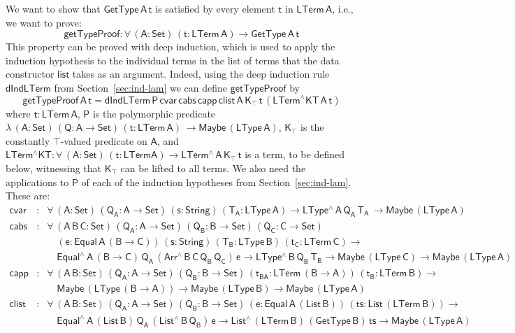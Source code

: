 \documentclass[9pt]{entcs}
\begin{document}
\noindent
We want to show that $\mathsf{GetType\,A\,t}$ is satisfied by every
element $\mathsf{t}$ in $\mathsf{LTerm\,A}$, i.e., we want to prove:
\[ \mathsf{getTypeProof : \forall \, (A : Set)\, (t : LTerm\,A) \to
   GetType \,A \,t}\] This property can be proved with deep
induction, which is used to apply the induction hypothesis to the
individual terms in the list of terms that the data constructor
$\mathsf{list}$ takes as an argument. Indeed, using the deep induction
rule $\mathsf{dIndLTerm}$ from Section~\ref{sec:ind-lam} we can define
$\mathsf{getTypeProof}$ by
\[ \mathsf{getTypeProof \,A \,t = 
    dIndLTerm\, P \, cvar\, cabs\, capp\, clist\, A\, K_\top\, t\,
    (LTerm^\wedge KT\, A\, t) }\] where $\mathsf{t : LTerm\,A}$,
$\mathsf{P}$ is the polymorphic predicate $\mathsf{ \lambda \, (A:
  Set)\, (Q : A \to Set)\, (t : LTerm\,A)\, \to Maybe \, (LType \,
  A)}$, $\mathsf{K_\top}$ is the constantly $\mathsf{\top}$-valued
predicate on $\mathsf{A}$, and $\mathsf{LTerm^\wedge KT : \forall\, (A
  : Set)\, (t : LTerm A) \to LTerm^{\wedge}\, A\, K_\top\,t}$ is a
term, to be defined below, witnessing that $\mathsf{K_\top}$ can be
lifted to all terms. We also need the applications to $\mathsf{P}$ of
each of the induction hypotheses from Section~\ref{sec:ind-lam}. These
are:
\[\begin{array}{lll}
\mathsf{cvar} & : & \mathsf{\forall\, (A : Set)\, (Q_A : A \to Set)\,
  (s : String)\, (T_A : LType\, A) \to LType^{\wedge} \, A\, Q_A\,
  T_A\, \to Maybe\, (LType\, A)}\\
 \mathsf{cabs} & : & \mathsf{\forall\, (A \, B\, C: Set)\, (Q_A : A
   \to Set)\, (Q_B : B \to Set)\, (Q_C : C \to Set)} \\ 
& &    \quad\mathsf{(e : Equal\, A\, (B \to C))\, (s : String)\, (T_B
   : LType\, B)\, (t_C : LTerm \, C)  \to} \\  
& & \quad\mathsf{Equal^{\wedge}\, A\, (B \to C)\, Q_A\,
   (Arr^{\wedge}\, B\, C\, Q_B\, Q_C)\, e  \to LType^{\wedge} \, B\,
   Q_B\, T_B  \to Maybe\, (LType\,C) \to Maybe\, (LType\, A)}\\
\mathsf{capp} & : & \mathsf{\forall\, (A \, B : Set)\, (Q_A : A \to
  Set)\, (Q_B : B \to Set)\,  (t_{BA}: LTerm\, (B \to A))\, (t_B :
  LTerm\, B)\to} \\  
& & \quad\mathsf{ Maybe\, (LType\, (B \to A))\to Maybe\, (LType\,
      B) \to Maybe\, (LType\, A)}\\
\mathsf{clist} & : & \mathsf{\forall\, (A \, B : Set)\, (Q_A : A \to
  Set)\, (Q_B : B \to Set)\, (e : Equal\, A\, (List\, B))\, (ts : 
  List\, (LTerm\, B)) \to}\\  
& & \quad\mathsf{Equal^{\wedge}\, A\, (List\,B) \, Q_A\,
  (List^{\wedge}\, B\, Q_B)\, e \to List^{\wedge}\, (LTerm\, B)\,
  (GetType\, B)\, ts \to Maybe\, (LType\, A)}
\end{array}\]
\end{document}
